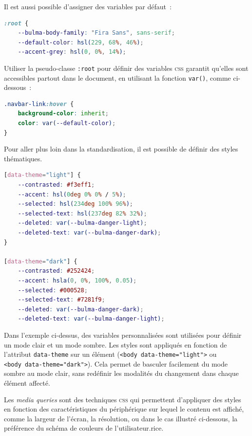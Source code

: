 Il est aussi possible d'assigner des variables par défaut~:

\begin{lstlisting}[language=css, frame=single, breaklines=true, caption={Créations de variables \textsc{css} personnalisées.}]
:root {
    --bulma-body-family: "Fira Sans", sans-serif;
    --default-color: hsl(229, 68%, 46%);
    --accent-grey: hsl(0, 0%, 14%);
\end{lstlisting}

Utiliser la pseudo-classe \texttt{:root} pour définir des variables \textsc{css}
garantit qu'elles sont accessibles partout dans le document, en
utilisant la fonction \texttt{var()}, comme ci-dessous~:

\begin{lstlisting}[language=css, frame=single, breaklines=true, caption={Utilisation de variables \textsc{css} personnalisées.}]
.navbar-link:hover {
    background-color: inherit;
    color: var(--default-color);
}
\end{lstlisting}

Pour aller plus loin dans la standardisation, il est possible de définir
des styles thématiques.

\begin{lstlisting}[language=css, frame=single, breaklines=true, caption={Définition d'un thème sombre et d'un thème claire grâce aux classes \textsc{css}.}]
[data-theme="light"] {
    --contrasted: #f3eff1;
    --accent: hsl(0deg 0% 0% / 5%);
    --selected: hsl(234deg 100% 96%);
    --selected-text: hsl(237deg 82% 32%);
    --deleted: var(--bulma-danger-light);
    --deleted-text: var(--bulma-danger-dark);
}

[data-theme="dark"] {
    --contrasted: #252424;
    --accent: hsla(0, 0%, 100%, 0.05);
    --selected: #000528;
    --selected-text: #7281f9;
    --deleted: var(--bulma-danger-dark);
    --deleted-text: var(--bulma-danger-light);
\end{lstlisting}

Dans l'exemple ci-dessus, des variables personnalisées sont utilisées
pour définir un mode clair et un mode sombre. Les styles sont appliqués
en fonction de l'attribut \texttt{data-theme} sur un élément \html
(\texttt{\textless{}body\ data-theme="light"\textgreater{}} ou
\texttt{\textless{}body\ data-theme="dark"\textgreater{}}). Cela permet
de basculer facilement du mode sombre au mode clair, sans redéfinir les
modalités du changement dans chaque élément affecté.

Les \textit{media queries} sont des techniques \textsc{css} qui permettent d'appliquer des
styles en fonction des caractéristiques du périphérique sur lequel le
contenu est affiché, comme la largeur de l'écran, la résolution, ou dans
le cas illustré ci-dessous, la préférence du schéma de couleurs de
l'utilisateur.rice.

